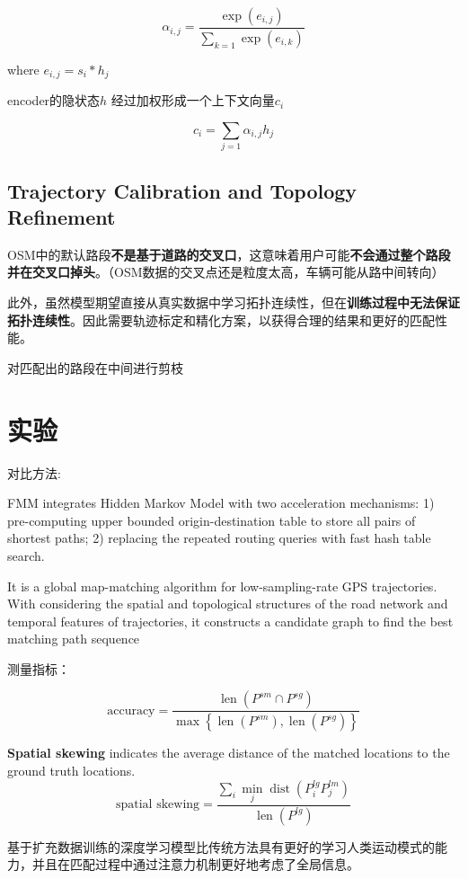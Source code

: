 $$ \alpha_{i, j}=\frac{\exp \left(e_{i, j}\right)}{\sum_{k=1} \exp \left(e_{i, k}\right)} $$

where $ e_{i, j}=s_{i} * h_{j} $

encoder的隐状态$h$ 经过加权形成一个上下文向量$c_i$

$$ c_{i}=\sum_{j=1} \alpha_{i, j} h_{j} $$

\subsection{Trajectory Calibration and Topology Refinement}

OSM中的默认路段\textbf{不是基于道路的交叉口}，这意味着用户可能\textbf{不会通过整个路段并在交叉口掉头}。（OSM数据的交叉点还是粒度太高，车辆可能从路中间转向）

此外，虽然模型期望直接从真实数据中学习拓扑连续性，但在\textbf{训练过程中无法保证拓扑连续性}。因此需要轨迹标定和精化方案，以获得合理的结果和更好的匹配性能。

对匹配出的路段在中间进行剪枝

\section{实验}

对比方法:

\begin{definition}
    \cite{Yang2018} FMM integrates Hidden
Markov Model with two acceleration mechanisms: 1)
pre-computing upper bounded origin-destination table to
store all pairs of shortest paths; 2) replacing the repeated
routing queries with fast hash table search.
\end{definition}

\begin{definition}[ST Matching]
    \cite{Lou2009} It is a global map-matching algorithm
    for low-sampling-rate GPS trajectories. With considering
    the spatial and topological structures of the road network
    and temporal features of trajectories, it constructs a candidate
    graph to find the best matching path sequence
\end{definition}

测量指标：


 $$\text{accuracy} =\frac{\operatorname{len}\left(P^{s m} \cap P^{s g}\right)}{\max \left\{\operatorname{len}\left(P^{s m}\right), \operatorname{len}\left(P^{s g}\right)\right\}} $$

 \textbf{Spatial skewing} indicates
the average distance of the matched locations to the ground
truth locations.
  $$\text{spatial skewing} =\frac{\sum_{i} \min _{j} \operatorname{dist}\left(P_{i}^{l g} P_{j}^{l m}\right)}{\operatorname{len}\left(P^{l g}\right)} $$

基于扩充数据训练的深度学习模型比传统方法具有更好的学习人类运动模式的能力，并且在匹配过程中通过注意力机制更好地考虑了全局信息。